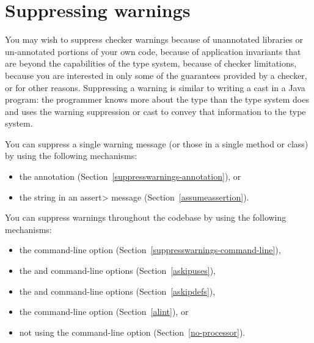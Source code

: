 \htmlhr
\chapter{Suppressing warnings\label{suppressing-warnings}}


You may wish to suppress checker warnings because of unannotated libraries
or un-annotated portions of your own code, because of application
invariants that are beyond the capabilities of the type system, because of
checker limitations, because you are interested in only some of the
guarantees provided by a checker, or for other reasons.
Suppressing a warning is similar to writing a cast in a Java
program:  the programmer knows more about the type than the type system does
and uses the warning suppression or cast to convey that information to the
type system.

You can suppress a single warning message (or those in a single method or
class) by using the following mechanisms:

\begin{itemize}
\item
  the  annotation
  (Section~\ref{suppresswarnings-annotation}), or
\item
  the  string in an \<assert> message (Section~\ref{assumeassertion}).
\end{itemize}

You can suppress warnings throughout the codebase by using the following mechanisms:

\begin{itemize}
\item
  the  command-line option (Section~\ref{suppresswarnings-command-line}),
\item
  the  and  command-line options (Section~\ref{askipuses}),
\item
  the  and  command-line options (Section~\ref{askipdefs}),
\item
  the  command-line option (Section~\ref{alint}), or
\item
  not using the  command-line option
  (Section~\ref{no-processor}).
\end{itemize}

